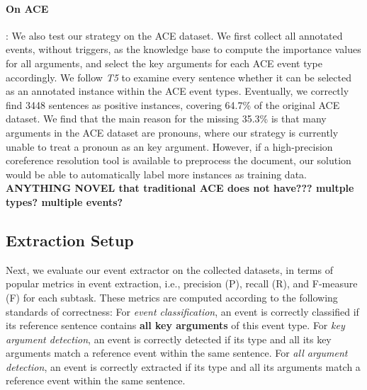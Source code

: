 

\paragraph{On ACE}: We also test our strategy on the ACE dataset. 
We first collect all annotated events, without triggers, as the knowledge base
to compute the importance values for all arguments, and select the key arguments 
for each ACE event type accordingly.  We follow \textit{T5} to examine every sentence
whether it can be selected as an annotated instance within the ACE event types.
Eventually, we correctly find 3448 sentences as positive instances, covering 
64.7\% of the original ACE dataset.  We find that the main reason for the 
missing 35.3\% is that many arguments in the ACE dataset are pronouns, 
where our strategy is currently unable to treat a pronoun as an key argument. However,
if a high-precision coreference resolution tool is available to preprocess the document,
our solution would be able to automatically label more instances as training data.
\textbf{ANYTHING NOVEL that traditional ACE does not have??? multple types? multiple events?}

 \subsection{Extraction Setup}\label{sec:evalevent}
Next, we evaluate our event extractor on the collected datasets,
in terms of popular metrics in event extraction, i.e., precision (P), recall (R), and F-measure (F) for each subtask. These metrics are computed according to the following standards of correctness: 
For \emph{event classification}, an event is correctly classified if its reference sentence contains \textbf{all key arguments} of this event type. 
For \emph{key argument detection}, an event is correctly detected if its type and all its key arguments match a reference event within the same sentence.
For \emph{all argument detection}, an event is correctly extracted if its type and all its arguments match a reference event within the same sentence. 

